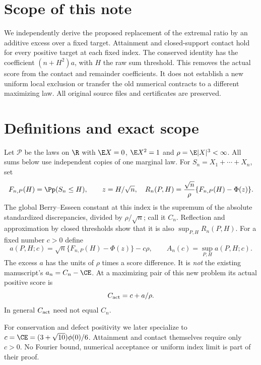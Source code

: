\section*{Scope of this note}
We independently derive the proposed replacement of the extremal ratio by
an additive excess over a fixed target. Attainment and closed-support
contact hold for every positive target at each fixed index. The conserved
identity has the coefficient $(n+H^2)a$, with $H$ the raw sum threshold.
This removes the actual score from the contact and remainder coefficients.
It does not establish a new uniform local exclusion or transfer the old
numerical contracts to a different maximizing law. All original source
files and certificates are preserved.

\section{Definitions and exact scope}
Let $\mathcal P$ be the laws on $\R$ with $\E X=0$, $\E X^2=1$ and
$\rho=\E|X|^3<\infty$. All sums below use independent copies of one
marginal law. For $S_n=X_1+\cdots+X_n$, set
\[
 F_{n,P}(H)=\Pp(S_n\le H),\qquad z=H/\sqrt n,
 \quad R_n(P,H)=\frac{\sqrt n}{\rho}\{F_{n,P}(H)-\Phi(z)\}.
\]
The global Berry--Esseen constant at this index is the supremum of the
absolute standardized discrepancies, divided by $\rho/\sqrt n$; call it
$C_n$. Reflection and approximation by closed thresholds show that it is
also $\sup_{P,H}R_n(P,H)$. For a fixed number $c>0$ define
\[
 a(P,H;c)=\sqrt n\{F_{n,P}(H)-\Phi(z)\}-c\rho,
 \qquad A_n(c)=\sup_{P,H}a(P,H;c).
\]
The excess $a$ has the units of $\rho$ times a score difference. It is
\emph{not} the existing manuscript's $a_n=C_n-\CE$. At a maximizing pair
of this new problem its actual positive score is
\begin{equation}\label{eq:actual}
 C_{\rm act}=c+a/\rho.
\end{equation}
In general $C_{\rm act}$ need not equal $C_n$.

For conservation and defect positivity we later specialize to
$c=\CE=(3+\sqrt{10})\phi(0)/6$. Attainment and contact themselves require
only $c>0$. No Fourier bound, numerical acceptance or uniform index limit
is part of their proof.

